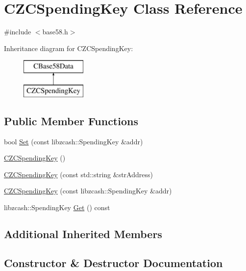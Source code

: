 \hypertarget{class_c_z_c_spending_key}{}\section{C\+Z\+C\+Spending\+Key Class Reference}
\label{class_c_z_c_spending_key}


{\ttfamily \#include $<$base58.\+h$>$}

Inheritance diagram for C\+Z\+C\+Spending\+Key\+:\begin{figure}[H]
\begin{center}
\leavevmode
\includegraphics[height=2.000000cm]{class_c_z_c_spending_key}
\end{center}
\end{figure}
\subsection*{Public Member Functions}
\begin{DoxyCompactItemize}
\item 
bool \mbox{\hyperlink{class_c_z_c_spending_key_ab91e15b8861b065869ebce8f3ec9e456}{Set}} (const libzcash\+::\+Spending\+Key \&addr)
\item 
\mbox{\hyperlink{class_c_z_c_spending_key_a7f77c4e7c377278280f5dd01b177fa93}{C\+Z\+C\+Spending\+Key}} ()
\item 
\mbox{\hyperlink{class_c_z_c_spending_key_a3f3ef9fbbc482c4de02b164c6633d30c}{C\+Z\+C\+Spending\+Key}} (const std\+::string \&str\+Address)
\item 
\mbox{\hyperlink{class_c_z_c_spending_key_a177a064e76f8627fd31768fd9094c376}{C\+Z\+C\+Spending\+Key}} (const libzcash\+::\+Spending\+Key \&addr)
\item 
libzcash\+::\+Spending\+Key \mbox{\hyperlink{class_c_z_c_spending_key_ab1dfdc5b045b63f0635eaa5904a59f7d}{Get}} () const
\end{DoxyCompactItemize}
\subsection*{Additional Inherited Members}


\subsection{Constructor \& Destructor Documentation}
\mbox{\label{class_c_z_c_spending_key_a7f77c4e7c377278280f5dd01b177fa93}} 
